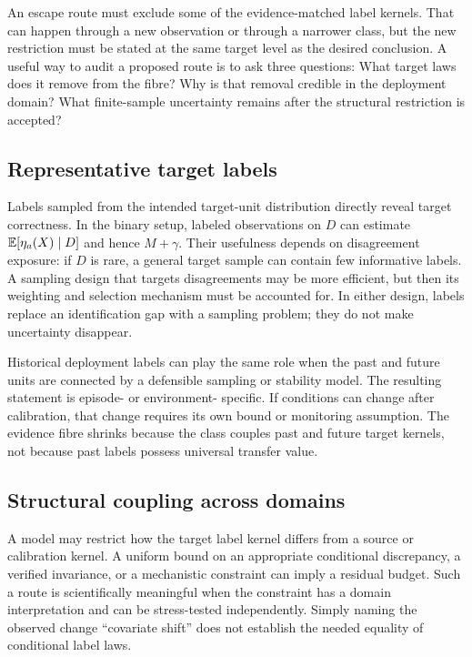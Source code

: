 An escape route must exclude some of the evidence-matched label kernels.  That can happen through a
new observation or through a narrower class, but the new restriction must be stated at the same
target level as the desired conclusion.  A useful way to audit a proposed route is to ask three
questions: What target laws does it remove from the fibre?  Why is that removal credible in the
deployment domain?  What finite-sample uncertainty remains after the structural restriction is
accepted?

\subsection{Representative target labels}
\label{fr:subsec-target-labels}

Labels sampled from the intended target-unit distribution directly reveal target correctness.  In
the binary setup, labeled observations on $D$ can estimate
$\mathbb{E}[\eta_a(X)\mid D]$ and hence $M+\gamma$.  Their usefulness depends on disagreement exposure: if
$D$ is rare, a general target sample can contain few informative labels.  A sampling design that
targets disagreements may be more efficient, but then its weighting and selection mechanism must
be accounted for.  In either design, labels replace an identification gap with a sampling problem;
they do not make uncertainty disappear.

Historical deployment labels can play the same role when the past and future units are connected by
a defensible sampling or stability model.  The resulting statement is episode- or environment-
specific.  If conditions can change after calibration, that change requires its own bound or
monitoring assumption.  The evidence fibre shrinks because the class couples past and future target
kernels, not because past labels possess universal transfer value.

\subsection{Structural coupling across domains}
\label{fr:subsec-domain-coupling}

A model may restrict how the target label kernel differs from a source or calibration kernel.  A
uniform bound on an appropriate conditional discrepancy, a verified invariance, or a mechanistic
constraint can imply a residual budget.  Such a route is scientifically meaningful when the
constraint has a domain interpretation and can be stress-tested independently.  Simply naming the
observed change ``covariate shift'' does not establish the needed equality of conditional label
laws.

